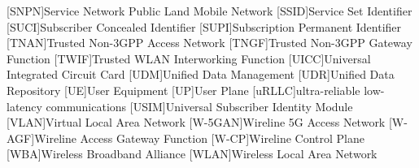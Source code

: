 \begin{multicols}{2}
\begin{acronym}[AAAAAA]
        [SNPN]{Service Network Public Land Mobile Network}
        [SSID]{Service Set Identifier}
        [SUCI]{Subscriber Concealed Identifier}
        [SUPI]{Subscription Permanent Identifier}
        [TNAN]{Trusted Non-3GPP Access Network}
        [TNGF]{Trusted Non-3GPP Gateway Function}
        [TWIF]{Trusted WLAN Interworking Function}
        [UICC]{Universal Integrated Circuit Card}
        [UDM]{Unified Data Management}
        [UDR]{Unified Data Repository}
        [UE]{User Equipment}
        [UP]{User Plane}
        [uRLLC]{ultra-reliable low-latency communications}
        [USIM]{Universal Subscriber Identity Module}
        [VLAN]{Virtual Local Area Network}
        [W-5GAN]{Wireline 5G Access Network}
        [W-AGF]{Wireline Access Gateway Function}
        [W-CP]{Wireline Control Plane}
        [WBA]{Wireless Broadband Alliance}
        [WLAN]{Wireless Local Area Network}
    \end{acronym}
\end{multicols}